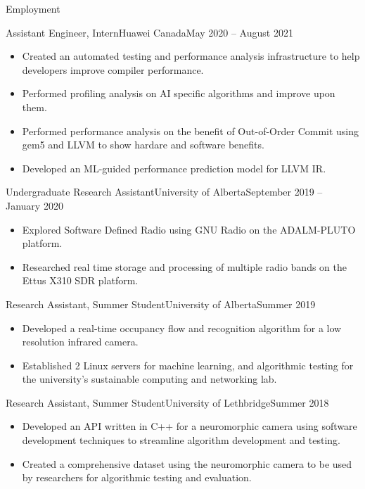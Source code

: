\documentclass[]{mcdowellcv}
\begin{document}
\begin{cvsection}{Employment}
   \begin{cvsubsection}{Assistant Engineer, Intern}{Huawei Canada}{May 2020 -- August 2021}
    \vspace*{5pt}
    \begin{itemize}
      \item Created an automated testing and performance analysis infrastructure to help developers improve compiler performance.
      \item Performed profiling analysis on AI specific algorithms and improve upon them.
      \item Performed performance analysis on the benefit of Out-of-Order Commit using gem5 and LLVM to show hardare and software benefits.
      \item Developed an ML-guided performance prediction model for LLVM IR.
    \end{itemize}

  \end{cvsubsection}
  
  \begin{cvsubsection}{Undergraduate Research Assistant}{University of Alberta}{September 2019 -- January 2020}
    \vspace*{5pt}
    \begin{itemize}
      \item Explored Software Defined Radio using GNU Radio on the ADALM-PLUTO platform.
      \item Researched real time storage and processing of multiple radio bands on the Ettus X310 SDR platform.
    \end{itemize}

  \end{cvsubsection}
  \begin{cvsubsection}{Research Assistant, Summer Student}{University of Alberta}{Summer 2019}
    \vspace*{5pt}		
    \begin{itemize}
      \item Developed a real-time occupancy flow and recognition algorithm for a low resolution infrared camera.
      \item Established 2 Linux servers for machine learning, and algorithmic testing for the university's sustainable computing and networking lab.
    \end{itemize}
  \end{cvsubsection}
  \begin{cvsubsection}{Research Assistant, Summer Student}{University of Lethbridge}{Summer 2018}	
    \vspace*{5pt}
    \begin{itemize}
      \item Developed an API written in C++ for a neuromorphic camera using software development techniques to streamline algorithm development and testing.
      \item Created a comprehensive dataset using the neuromorphic camera to be used by researchers for algorithmic testing and evaluation.
    \end{itemize}
  \end{cvsubsection}
\end{cvsection}
\end{document}
